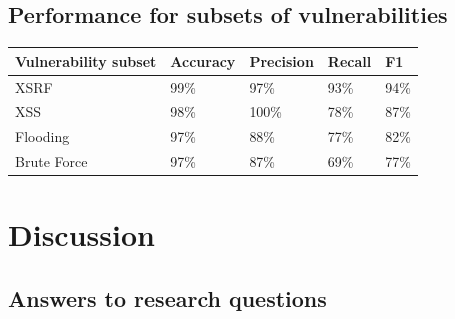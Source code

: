 \documentclass[
	a4paper,
	pagesize,
	pdftex,
	12pt,
	twoside, %
	BCOR=5mm, %
	ngerman,
	fleqn,
	final,
	]{scrartcl}
\begin{document}
\subsection{Performance for subsets of vulnerabilities}



\begin{tabular}{ | p{5cm} || p{2cm}|p{2cm}|p{2cm}|p{2cm}|  }
	\hline
	\textbf{Vulnerability subset} & \textbf{Accuracy} & \textbf{Precision} & \textbf{Recall} & \textbf{F1} \\
	\hline
	XSRF & 99\% & 97\% & 93\% & 94\% \\
	XSS & 98\% & 100\% & 78\% & 87\% \\
	Flooding & 97\% & 88\% & 77\% & 82\% \\
	Brute Force & 97\% & 87\% & 69\% & 77\% \\
	
	
	
	
	
	\hline
	\hline
\end{tabular}



\newpage
\section{Discussion}


\subsection{Answers to research questions}
\end{document}
